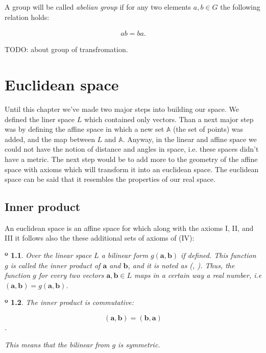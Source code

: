 \documentclass{book}
\newtheorem{axiom}{º}
\begin{document}
A group will be called \emph{abelian group} if for any two elements $a, b \in G$ the following relation holds:

\begin{align*}
ab = ba.
\end{align*}

TODO: about group of transfromation.

\chapter{Euclidean space}

Until this chapter we've made two major steps into building our space. We defined the liner space $L$ which contained only vectors. Than a next major step was by defining the affine space in which a new set $\mathbb{A}$ (the set of points) was added, and the map between $L$ and $\mathbb{A}$. Anyway, in the linear and affine space we could not have the notion of distance and angles in space, i.e. these spaces didn't have a metric. The next step would be to add more to the geometry of the affine space with axioms which will transform it into an euclidean space. The euclidean space can be said that it resembles the properties of our real space.

\section{Inner product}

An euclidean space is an affine space for which along with the axioms I, II, and III it follows also the these additional sets of axioms of (IV):

\begin{axiom}
Over the linear space $L$ a bilinear form $g(\boldsymbol{a}, \boldsymbol{b})$ if defined. This function $g$ is called the inner product of $\boldsymbol{a}$ and $\boldsymbol{b}$, and it is noted as (, ). Thus, the function $g$ for every two vectors $\boldsymbol{a}, \boldsymbol{b} \in L$ maps in a certain way a real number, i.e $(\boldsymbol{a}, \boldsymbol{b}) = g(\boldsymbol{a}, \boldsymbol{b})$.
\end{axiom}

\begin{axiom}
The inner product is commutative:

\[(\boldsymbol{a}, \boldsymbol{b}) = (\boldsymbol{b}, \boldsymbol{a})\].

This means that the bilinear from $g$ is symmetric.
\end{axiom}
\end{document}

